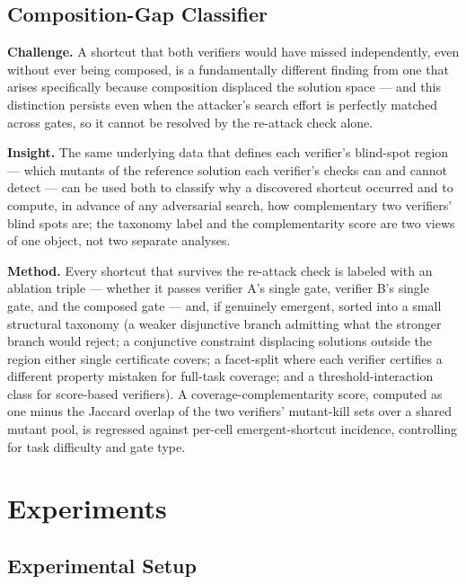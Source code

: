 \documentclass[11pt]{article}
\begin{document}
\subsection{Composition-Gap Classifier}
\textbf{Challenge.} A shortcut that both verifiers would have missed independently, even without ever being composed, is a fundamentally different finding from one that arises specifically because composition displaced the solution space --- and this distinction persists even when the attacker's search effort is perfectly matched across gates, so it cannot be resolved by the re-attack check alone.

\textbf{Insight.} The same underlying data that defines each verifier's blind-spot region --- which mutants of the reference solution each verifier's checks can and cannot detect --- can be used both to classify why a discovered shortcut occurred and to compute, in advance of any adversarial search, how complementary two verifiers' blind spots are; the taxonomy label and the complementarity score are two views of one object, not two separate analyses.

\textbf{Method.} Every shortcut that survives the re-attack check is labeled with an ablation triple --- whether it passes verifier A's single gate, verifier B's single gate, and the composed gate --- and, if genuinely emergent, sorted into a small structural taxonomy (a weaker disjunctive branch admitting what the stronger branch would reject; a conjunctive constraint displacing solutions outside the region either single certificate covers; a facet-split where each verifier certifies a different property mistaken for full-task coverage; and a threshold-interaction class for score-based verifiers). A coverage-complementarity score, computed as one minus the Jaccard overlap of the two verifiers' mutant-kill sets over a shared mutant pool, is regressed against per-cell emergent-shortcut incidence, controlling for task difficulty and gate type.

\section{Experiments}

\subsection{Experimental Setup}
\end{document}
